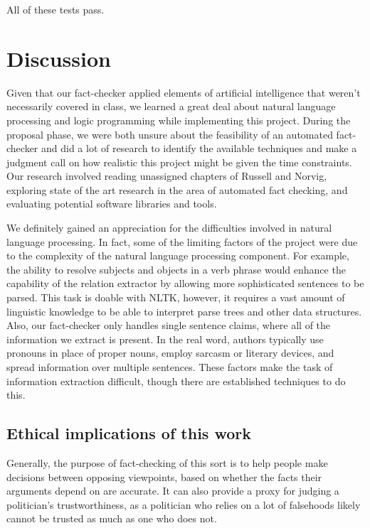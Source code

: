 \documentclass{chi2009}
\begin{document}
All of these tests pass.

\section{Discussion}

Given that our fact-checker applied elements of artificial intelligence that weren't necessarily covered in class, we learned a great deal about natural language processing and logic programming while implementing this project.  During the proposal phase, we were both unsure about the feasibility of an automated fact-checker and did a lot of research to identify the available techniques and make a judgment call on how realistic this project might be given the time constraints.  Our research involved reading unassigned chapters of Russell and Norvig, exploring state of the art research in the area of automated fact checking, and evaluating potential software libraries and tools.  

We definitely gained an appreciation for the difficulties involved in natural language processing.  In fact, some of the limiting factors of the project were due to the complexity of the natural language processing component.  For example, the ability to resolve subjects and objects in a verb phrase would enhance the capability of the relation extractor by allowing more sophisticated sentences to be parsed.  This task is doable with NLTK, however, it requires a vast amount of linguistic knowledge to be able to interpret parse trees and other data structures.  Also, our fact-checker only handles single sentence claims, where all of the information we extract is present.  In the real word, authors typically use pronouns in place of proper nouns, employ sarcasm or literary devices, and spread information over multiple sentences.  These factors make the task of information extraction difficult, though there are established techniques to do this.

\subsection{Ethical implications of this work}

Generally, the purpose of fact-checking of this sort is to help people make decisions between opposing viewpoints, based on whether the facts their arguments depend on are accurate.
It can also provide a proxy for judging a politician's trustworthiness, as a politician who relies on a lot of falsehoods likely cannot be trusted as much as one who does not.
\end{document}
